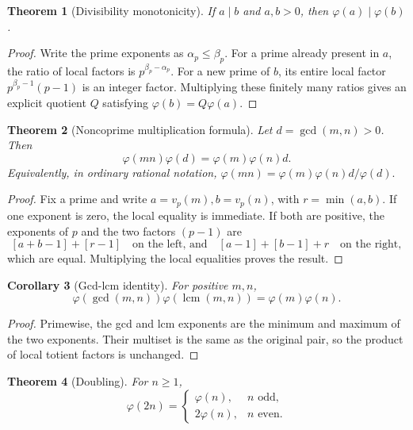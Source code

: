 \documentclass[11pt]{article}
\newtheorem{theorem}{Theorem}[section]
\newtheorem{corollary}[theorem]{Corollary}
\theoremstyle{definition}
\begin{document}
\begin{theorem}[Divisibility monotonicity]\label{thm:phi-divides}
If \(a\mid b\) and \(a,b>0\), then \(\varphi(a)\mid\varphi(b)\).
\end{theorem}

\begin{proof}
Write the prime exponents as \(\alpha_p\le\beta_p\).  For a prime already
present in \(a\), the ratio of local factors is \(p^{\beta_p-\alpha_p}\).
For a new prime of \(b\), its entire local factor
\(p^{\beta_p-1}(p-1)\) is an integer factor.  Multiplying these finitely many
ratios gives an explicit quotient \(Q\) satisfying
\(\varphi(b)=Q\varphi(a)\).
\end{proof}

\begin{theorem}[Noncoprime multiplication formula]\label{thm:phi-general-mul}
Let \(d=\gcd(m,n)>0\).  Then
\[
 \boxed{\varphi(mn)\varphi(d)=\varphi(m)\varphi(n)d.}
\]
Equivalently, in ordinary rational notation,
\(
 \varphi(mn)=\varphi(m)\varphi(n)d/\varphi(d).
\)
\end{theorem}

\begin{proof}
Fix a prime and write \(a=v_p(m), b=v_p(n)\), with
\(r=\min(a,b)\).  If one exponent is zero, the local equality is immediate.
If both are positive, the exponents of \(p\) and the two factors \((p-1)\)
are
\[
 [a+b-1]+[r-1]
 \quad\text{on the left, and}\quad
 [a-1]+[b-1]+r
 \quad\text{on the right},
\]
which are equal.  Multiplying the local equalities proves the result.
\end{proof}

\begin{corollary}[Gcd-lcm identity]\label{cor:phi-gcd-lcm}
For positive \(m,n\),
\[
 \boxed{\varphi(\gcd(m,n))\varphi(\operatorname{lcm}(m,n))
 =\varphi(m)\varphi(n).}
\]
\end{corollary}

\begin{proof}
Primewise, the gcd and lcm exponents are the minimum and maximum of the two
exponents.  Their multiset is the same as the original pair, so the product of
local totient factors is unchanged.
\end{proof}

\begin{theorem}[Doubling]\label{thm:phi-double}
For \(n\ge1\),
\[
 \varphi(2n)=\begin{cases}
 \varphi(n),&n\text{ odd},\\
 2\varphi(n),&n\text{ even}.
 \end{cases}
\]
\end{theorem}
\end{document}
